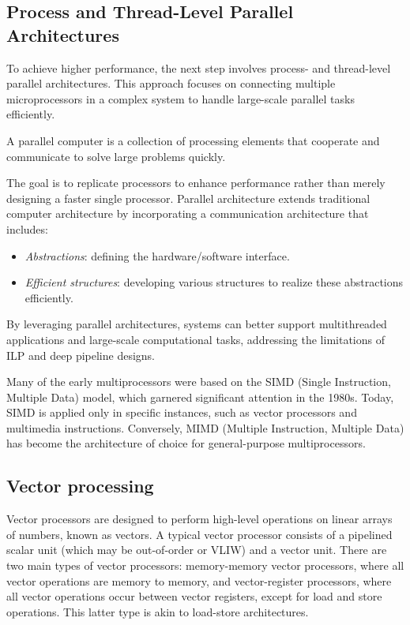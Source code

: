 \subsection{Process and Thread-Level Parallel Architectures}
To achieve higher performance, the next step involves process- and thread-level parallel architectures. 
This approach focuses on connecting multiple microprocessors in a complex system to handle large-scale parallel tasks efficiently.
\begin{definition}
    A parallel computer is a collection of processing elements that cooperate and communicate to solve large problems quickly.
\end{definition}
The goal is to replicate processors to enhance performance rather than merely designing a faster single processor. 
Parallel architecture extends traditional computer architecture by incorporating a communication architecture that includes:
\begin{itemize}
    \item \textit{Abstractions}: defining the hardware/software interface.
    \item \textit{Efficient structures}: developing various structures to realize these abstractions efficiently.
\end{itemize}
By leveraging parallel architectures, systems can better support multithreaded applications and large-scale computational tasks, addressing the limitations of ILP and deep pipeline designs.

Many of the early multiprocessors were based on the SIMD (Single Instruction, Multiple Data) model, which garnered significant attention in the 1980s. 
Today, SIMD is applied only in specific instances, such as vector processors and multimedia instructions. 
Conversely, MIMD (Multiple Instruction, Multiple Data) has become the architecture of choice for general-purpose multiprocessors.

\subsection{Vector processing}
Vector processors are designed to perform high-level operations on linear arrays of numbers, known as vectors.
A typical vector processor consists of a pipelined scalar unit (which may be out-of-order or VLIW) and a vector unit. 
There are two main types of vector processors: memory-memory vector processors, where all vector operations are memory to memory, and vector-register processors, where all vector operations occur between vector registers, except for load and store operations. 
This latter type is akin to load-store architectures.


